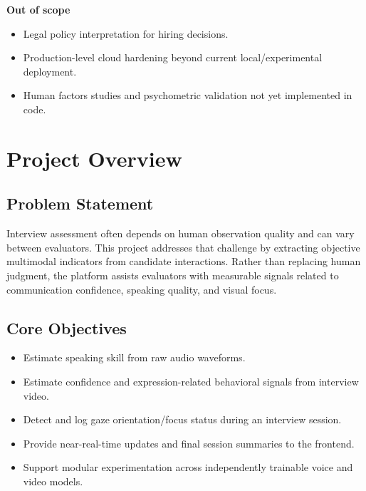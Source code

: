 \documentclass[12pt,a4paper]{report}
\begin{document}
\textbf{Out of scope}
\begin{itemize}[leftmargin=1.5em]
\item Legal policy interpretation for hiring decisions.
\item Production-level cloud hardening beyond current local/experimental deployment.
\item Human factors studies and psychometric validation not yet implemented in code.
\end{itemize}

\tableofcontents
\listoftables
\listoffigures

\cleardoublepage
{}

\chapter{Project Overview}
\section{Problem Statement}
Interview assessment often depends on human observation quality and can vary between evaluators. This project addresses that challenge by extracting objective multimodal indicators from candidate interactions. Rather than replacing human judgment, the platform assists evaluators with measurable signals related to communication confidence, speaking quality, and visual focus.

\section{Core Objectives}
\begin{itemize}[leftmargin=1.5em]
\item Estimate speaking skill from raw audio waveforms.
\item Estimate confidence and expression-related behavioral signals from interview video.
\item Detect and log gaze orientation/focus status during an interview session.
\item Provide near-real-time updates and final session summaries to the frontend.
\item Support modular experimentation across independently trainable voice and video models.
\end{itemize}
\end{document}

